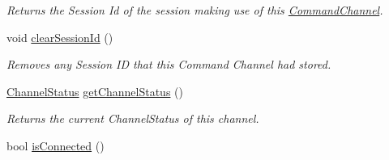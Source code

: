 \begin{DoxyCompactItemize}
\begin{DoxyCompactList}\small\item\em Returns the Session Id of the session making use of this \hyperlink{class_picto_1_1_command_channel}{Command\-Channel}. \end{DoxyCompactList}\item 
void \hyperlink{class_picto_1_1_command_channel_a80e492ff5325ea3c0bbfe22bbe02863f}{clear\-Session\-Id} ()
\begin{DoxyCompactList}\small\item\em Removes any Session I\-D that this Command Channel had stored. \end{DoxyCompactList}\item 
\hypertarget{class_picto_1_1_command_channel_a0ec9175282cb98e99ece960376f3da12}{\hyperlink{class_picto_1_1_command_channel_ab7d91aac6340369c17e2bd2be8a465db}{Channel\-Status} \hyperlink{class_picto_1_1_command_channel_a0ec9175282cb98e99ece960376f3da12}{get\-Channel\-Status} ()}\label{class_picto_1_1_command_channel_a0ec9175282cb98e99ece960376f3da12}

\begin{DoxyCompactList}\small\item\em Returns the current Channel\-Status of this channel. \end{DoxyCompactList}\item 
\hypertarget{class_picto_1_1_command_channel_aa081f7ae579624416e409f2cdd69b456}{bool \hyperlink{class_picto_1_1_command_channel_aa081f7ae579624416e409f2cdd69b456}{is\-Connected} ()}\label{class_picto_1_1_command_channel_aa081f7ae579624416e409f2cdd69b456}


\end{DoxyCompactItemize}
